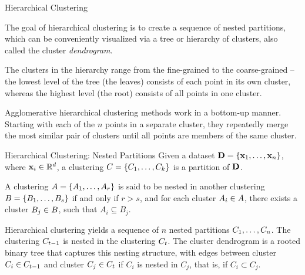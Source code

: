 
\date{Chapter 14: Hierarchical Clustering}

\begin{frame}
\titlepage
\end{frame}



\begin{frame}{Hierarchical Clustering}

  The goal of hierarchical clustering is to create a sequence of nested
  partitions, which can be conveniently visualized via a tree or
  \hbox{hierarchy} of clusters, also called the cluster {\em
  dendrogram}.  

  \bigskip
The clusters in the hierarchy range from the f\/{i}ne-grained to the
coarse-grained -- the lowest level of the tree (the leaves) consists of
each point in its own cluster, whereas the highest level (the root)
consists of all points in one cluster.  

\bigskip
Agglomerative hierarchical clustering methods work 
in a bottom-up manner. Starting
with each of the $n$ points in a separate cluster, they repeatedly merge
the most similar pair of clusters until all points are members of the
same cluster.  
\end{frame}


\begin{frame}{Hierarchical Clustering: Nested Partitions}
Given a dataset $\mathbf{D} = \{\mathbf{x}_1, \ldots, \mathbf{x}_n\}$,
where $\mathbf{x}_i \in {\mathord{\mathbb R}}^d$, a clustering ${\relax C} = \{C_1, \ldots,
C_k\}$ is a partition of $\mathbf{D}$.

\bigskip A
clustering ${\relax A} = \{A_1, \ldots, A_r\}$ is said to be nested in another
clustering ${\relax B} = \{B_1, \ldots, B_s\}$ if and only if $r > s$, and for
each cluster $A_i \in {\relax A}$, there exists a cluster $B_{j} \in {\relax B}$, such
that $A_i \subseteq B_{j}$. 

\bigskip
Hierarchical clustering yields a sequence of
$n$ nested partitions ${\relax C}_1, \ldots, {\relax C}_n$. 
The clustering ${\relax C}_{t-1}$ is nested in the clustering ${\relax C}_t$.
The cluster dendrogram is a rooted binary tree that captures this nesting
structure, with edges between cluster $C_i \in {\relax C}_{t-1}$ and cluster
$C_{j} \in {\relax C}_{t}$ if $C_i$ is nested in $C_{j}$, that is, if $C_i \subset
C_{j}$. 
\end{frame}


